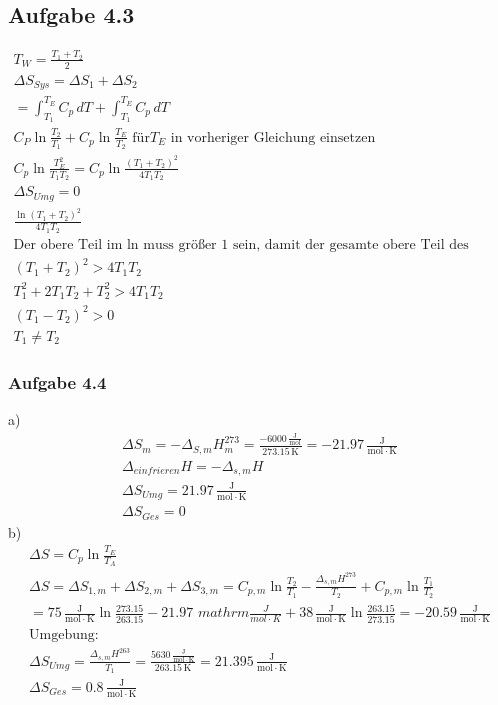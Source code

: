 \documentclass{article}
\begin{document}
\subsection*{Aufgabe 4.3}
\begin{eqnarray*}
    T_W =\frac{T_1+T_2}{2}\\
    \Delta S_{Sys} = \Delta S_1 + \Delta S_2\\
    = \int_{T_1}^{T_E}C_p\,dT + \int_{T_1}^{T_E}C_p\,dT\\
    C_P\ln\frac{T_2}{T_1}+C_p\ln\frac{T_E}{T_2} \text{ für} T_E \text{ in vorheriger Gleichung einsetzen}\\
    C_p\ln\frac{T_E^2}{T_1T_2}=C_p\ln\frac{\left(T_1+T_2\right)^2}{4T_1T_2}\\
    \Delta S_{Umg} = 0\\
    \frac{\ln\left(T_1 + T_2\right)^2}{4T_1T_2}\\\text{Der obere Teil im ln muss größer 1 sein, damit der gesamte obere Teil des Bruches größer als 1 wird}\\
    (T_1 + T_2)^2 > 4T_1T_2\\
    T_1^2+2T_1T_2+T_2^2 > 4T_1T_2\\
    (T_1 - T_2)^2 > 0\\
    T_1 \neq T_2
\end{eqnarray*}

\subsubsection*{Aufgabe 4.4}
a)\begin{eqnarray*}
    \Delta S_m = -\Delta_{S,m} H_m^{273}=\frac{-6000\,\mathrm{\frac{J}{mol}}}{273.15\,\mathrm{K}}=-21.97\,\mathrm{\frac{J}{mol\cdot K}}\\
    \Delta_{einfrieren}H = -\Delta_{s,m}H\\
    \Delta S_{Umg} = 21.97\,\mathrm{\frac{J}{mol\cdot K}}\\
    \Delta S_{Ges} = 0
\end{eqnarray*}
b)\begin{eqnarray*}
    \Delta S =C_p\ln\frac{T_E}{T_A}\\
    \Delta S = \Delta S_{1,m} + \Delta S_{2,m} + \Delta S_{3,m} = C_{p,m}\ln\frac{T_2}{T_1}-\frac{\Delta_{s,m}H^{273}}{T_2}+C_{p,m}\ln\frac{T_1}{T_2}\\
    =75\,\mathrm{\frac{J}{mol\cdot K}}\ln\frac{273.15}{263.15}-21.97\,\,mathrm{\frac{J}{mol\cdot K}}+38\,\mathrm{\frac{J}{mol\cdot K}}\ln\frac{263.15}{273.15}=-20.59\,\mathrm{\frac{J}{mol\cdot K}}\\
    \mathrm{Umgebung}:\\
    \Delta S_{Umg} = \frac{\Delta_{s,m} H ^{263}}{T_1} = \frac{5630\,\mathrm{\frac{J}{mol\cdot K}}}{263.15\,\mathrm{K}}=21.395\,\mathrm{\frac{J}{mol\cdot K}}\\
    \Delta S_{Ges} = 0.8\,\mathrm{\frac{J}{mol\cdot K}}
\end{eqnarray*}
\end{document}
